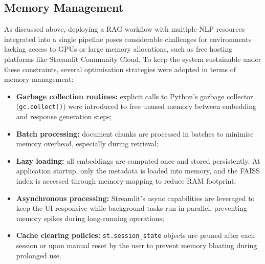 \begin{spacing}{1.5}
\subsection{Memory Management}
As discussed above, deploying a RAG workflow with multiple NLP resources integrated into a single pipeline poses considerable challenges for environments lacking access to GPUs or large memory allocations, such as free hosting platforms like Streamlit Community Cloud. To keep the system sustainable under these constraints, several optimisation strategies were adopted in terms of memory management:
\begin{itemize}
\item \textbf{Garbage collection routines:} explicit calls to Python's garbage collector (\texttt{gc.collect()}) were introduced to free unused memory between embedding and response generation steps;
\item \textbf{Batch processing:} document chunks are processed in batches to minimise memory overhead, especially during retrieval;
\item \textbf{Lazy loading:} all embeddings are computed once and stored persistently. At application startup, only the metadata is loaded into memory, and the FAISS index is accessed through memory-mapping to reduce RAM footprint;
\item \textbf{Asynchronous processing:} Streamlit's async capabilities are leveraged to keep the UI responsive while background tasks run in parallel, preventing memory spikes during long-running operations;
\item \textbf{Cache clearing policies:} \texttt{st.session\_state} objects are pruned after each session or upon manual reset by the user to prevent memory bloating during prolonged use.
\end{itemize}


\end{spacing}
